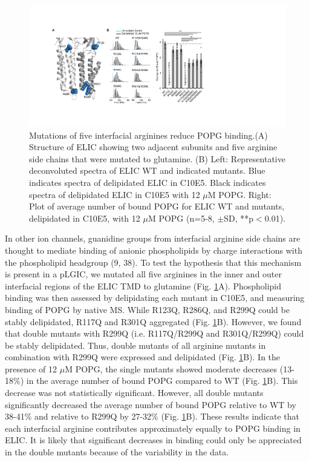 \begin{figure}
\includegraphics[width=1\linewidth]{./pandoc_test/media/image5.pdf}
\caption[Mutations of five interfacial arginines reduce POPG binding.] {Mutations of five interfacial arginines reduce POPG binding.(A) Structure of ELIC showing two adjacent subunits and five arginine side chains that were mutated to glutamine. (B) Left: Representative deconvoluted spectra of ELIC WT and indicated mutants. Blue indicates spectra of delipidated ELIC in C10E5. Black indicates spectra of delipidated ELIC in C10E5 with 12 $\mu$M POPG. Right: Plot of average number of bound POPG for ELIC WT and mutants, delipidated in C10E5, with 12 $\mu$M POPG (n=5-8, $\pm$SD, **p$<$0.01).} \label{fig:six}
\end{figure}

In other ion channels, guanidine groups from interfacial arginine side
chains are thought to mediate binding of anionic phospholipids by charge
interactions with the phospholipid headgroup (9, 38). To test the
hypothesis that this mechanism is present in a pLGIC, we mutated all
five arginines in the inner and outer interfacial regions of the ELIC
TMD to glutamine (Fig. \ref{fig:six}A). Phospholipid binding was then assessed by
delipidating each mutant in C10E5, and measuring binding of POPG by
native MS. While R123Q, R286Q, and R299Q could be stably delipidated,
R117Q and R301Q aggregated (Fig. \ref{fig:six}B). However, we found that double
mutants with R299Q (i.e. R117Q/R299Q and R301Q/R299Q) could be stably delipidated. Thus, double
mutants of all arginine mutants in combination with R299Q were expressed
and delipidated (Fig. \ref{fig:six}B). In the presence of 12 $\mu$M POPG, the single
mutants showed moderate decreases (13-18\%) in the average number of
bound POPG compared to WT (Fig. \ref{fig:six}B). This decrease was not statistically
significant. However, all double mutants significantly decreased the
average number of bound POPG relative to WT by 38-41\% and relative to
R299Q by 27-32\% (Fig. \ref{fig:six}B). These results indicate that each interfacial
arginine contributes approximately equally to POPG binding in ELIC. It
is likely that significant decreases in binding could only be
appreciated in the double mutants because of the variability in the
data.

